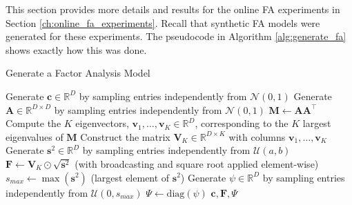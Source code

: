 \documentclass[msc,deptreport.inf]{infthesis} %
\newcommand{\matr}[1]{\mathbf{#1}}
\newcommand{\R}{\mathbb R}
\begin{document}
This section provides more details and results for the online FA experiments in Section \ref{ch:online_fa_experiments}. Recall that synthetic FA models were generated for these experiments. The pseudocode in Algorithm \ref{alg:generate_fa} shows exactly how this was done.
  \begin{algorithm}[!htbp] 
	\caption{Generate a Factor Analysis Model}
	\label{alg:generate_fa}
	\begin{algorithmic}[1]
		\State Generate $\matr{c} \in \R^D$ by sampling entries independently from $\mathcal{N}(0, 1)$
		\State Generate $\matr{A} \in \R^{D \times D}$ by sampling entries independently from $\mathcal{N}(0, 1)$
		\State $\matr{M} \leftarrow \matr{A} \matr{A}^\intercal$
		\State Compute the $K$ eigenvectors, $\matr{v}_1, \dots, \matr{v}_K \in \R^D$, corresponding to the $K$ largest eigenvalues of $\matr{M}$
		\State Construct the matrix $\matr{V}_K \in \R^{D \times K}$ with columns $\matr{v}_1, \dots, \matr{v}_K$
		\State Generate $\matr{s}^2 \in \R^D$ by sampling entries independently from $\mathcal{U}(a, b)$
		\State $\matr{F} \leftarrow \matr{V}_K \odot \sqrt{\matr{s}^2}$ (with broadcasting and square root applied element-wise)
		\State $s_{max} \leftarrow \max({\matr{s}^2})$ (largest element of ${\matr{s}^2}$)
		\State Generate $\psi \in \R^D$ by sampling entries independently from $\mathcal{U}(0, s_{max}) $
		\State $\Psi \leftarrow \text{diag}(\psi)$
		\State \Return $\matr{c}, \matr{F}, \Psi$	
	\end{algorithmic}
\end{algorithm}
\end{document}
